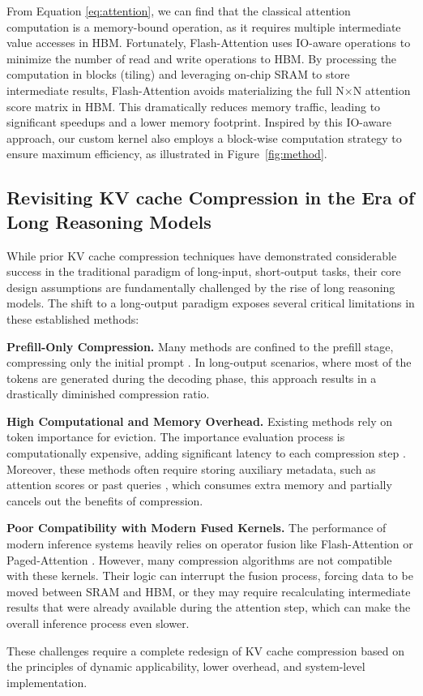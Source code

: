 From Equation \ref{eq:attention}, we can find that the classical attention computation is a memory-bound operation, as it requires multiple intermediate value accesses in HBM. Fortunately, Flash-Attention \cite{dao2022flashattention, dao2023flashattention2} uses IO-aware operations to minimize the number of read and write operations to HBM. By processing the computation in blocks (tiling) and leveraging on-chip SRAM to store intermediate results, Flash-Attention avoids materializing the full N×N attention score matrix in HBM. This dramatically reduces memory traffic, leading to significant speedups and a lower memory footprint. Inspired by this IO-aware approach, our custom kernel also employs a block-wise computation strategy to ensure maximum efficiency, as illustrated in Figure~\ref{fig:method}.


\subsection{Revisiting KV cache Compression in the Era of Long Reasoning Models}

While prior KV cache compression techniques have demonstrated considerable success in the traditional paradigm of long-input, short-output tasks, their core design assumptions are fundamentally challenged by the rise of long reasoning models. The shift to a long-output paradigm exposes several critical limitations in these established methods:

\noindent\textbf{Prefill-Only Compression.} Many methods are confined to the prefill stage, compressing only the initial prompt \citep{pyramidkv}. In long-output scenarios, where most of the tokens are generated during the decoding phase, this approach results in a drastically diminished compression ratio.



\noindent\textbf{High Computational and Memory Overhead.} Existing methods rely on token importance for eviction. The importance evaluation process is computationally expensive, adding significant latency to each compression step \citep{vatp,rkv}. Moreover, these methods often require storing auxiliary metadata, such as attention scores \citep{h2o} or past queries \citep{snapkv}, which consumes extra memory and partially cancels out the benefits of compression.

\noindent\textbf{Poor Compatibility with Modern Fused Kernels.} The performance of modern inference systems heavily relies on operator fusion like Flash-Attention \citep{dao2022flashattention,dao2023flashattention2} or Paged-Attention \citep{vllm}.
However, many compression algorithms are not compatible with these kernels.
Their logic can interrupt the fusion process, forcing data to be moved between SRAM and HBM, or they may require recalculating intermediate results that were already available during the attention step, which can make the overall inference process even slower.

These challenges require a complete redesign of KV cache compression based on the principles of dynamic applicability, lower overhead, and system-level implementation.